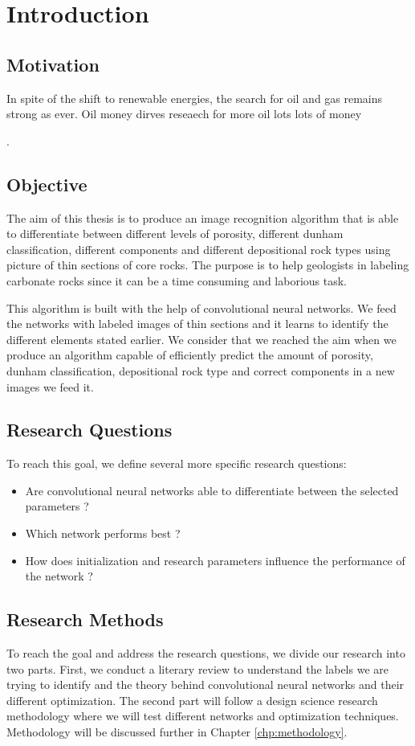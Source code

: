 \chapter{Introduction}
\label{chp:introduction} 
\section{Motivation}
In spite of the shift to renewable energies, the search for oil and gas remains strong as ever.  Oil money dirves reseaech for more oil lots lots of money

. 
\section{Objective}
The aim of this thesis is to produce an image recognition algorithm that is able to differentiate between different levels of porosity, different dunham classification, different components and different depositional rock types using picture of thin sections of core rocks. The purpose is to help geologists in labeling carbonate rocks since it can be a time consuming and laborious task. 

This algorithm is built with the help of convolutional neural networks. We feed the networks with labeled images of thin sections and it learns to identify the different elements stated earlier. We consider that we reached the aim when we produce an algorithm capable of efficiently predict the amount of porosity, dunham classification, depositional rock type and correct components in a new images we feed it. 

\section{Research Questions}
To reach this goal, we define several more specific research questions: 
\begin{itemize}
    \item Are convolutional neural networks able to differentiate between the selected parameters ?
    \item Which network performs best ?
    \item How does initialization and research parameters influence the performance of the network ?
\end{itemize}
\section{Research Methods}\label{sec:research-method}
To reach the goal and address the research questions, we divide our research into two parts. First, we conduct a literary review to understand the labels we are trying to identify and the theory behind convolutional neural networks and their different optimization. The second part will follow a design science research methodology where we will test different networks and optimization techniques. Methodology will be discussed further in Chapter \ref{chp:methodology}.
